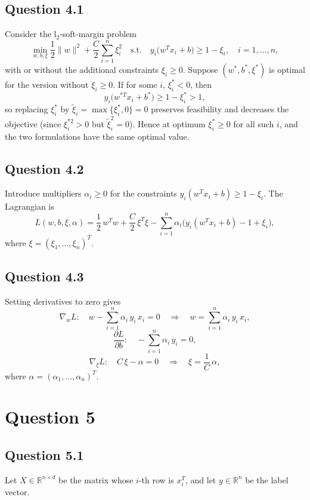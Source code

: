 \documentclass[a4paper]{article}
\begin{document}
\subsection*{Question 4.1}
Consider the l$_2$-soft-margin problem
\[
\min_{w,b,\xi} \frac12\|w\|^2+\frac{C}{2}\sum_{i=1}^n\xi_i^2
\quad\text{s.t.}\quad
y_i\bigl(w^T x_i + b\bigr)\ge 1-\xi_i,\quad i=1,\dots,n,
\]
with or without the additional constraints \(\xi_i\ge0\).  Suppose \((w^*,b^*,\xi^*)\) is optimal for the version without \(\xi_i\ge0\).  If for some \(i\), \(\xi^*_i<0\), then
\[
y_i\bigl(w^{*T}x_i + b^*\bigr) \ge 1-\xi^*_i > 1,
\]
so replacing \(\xi^*_i\) by \(\tilde\xi_i=\max\{\xi^*_i,0\}=0\) preserves feasibility and decreases the objective (since \(\xi^{*2}_i>0\) but \(\tilde\xi_i^2=0\)).  Hence at optimum \(\xi^*_i\ge0\) for all such \(i\), and the two formulations have the same optimal value.


\vspace{2ex}
\subsection*{Question 4.2}
Introduce multipliers \(\alpha_i\ge0\) for the constraints \(y_i(w^T x_i+b)\ge1-\xi_i\).  The Lagrangian is
\[
L(w,b,\xi,\alpha)
=\frac12\,w^T w+\frac{C}{2}\,\xi^T\xi
-\sum_{i=1}^n\alpha_i\bigl(y_i(w^T x_i+b)-1+\xi_i\bigr),
\]
where \(\xi=(\xi_1,\dots,\xi_n)^T\).


\vspace{2ex}
\subsection*{Question 4.3}
Setting derivatives to zero gives
\[
\nabla_w L:\quad
w-\sum_{i=1}^n\alpha_i\,y_i\,x_i=0
\quad\Longrightarrow\quad
w=\sum_{i=1}^n\alpha_i\,y_i\,x_i,
\]
\[
\frac{\partial L}{\partial b}:\quad
-\sum_{i=1}^n\alpha_i\,y_i=0,
\]
\[
\nabla_{\xi}L:\quad
C\,\xi-\alpha=0
\quad\Longrightarrow\quad
\xi=\frac{1}{C}\,\alpha,
\]
where \(\alpha=(\alpha_1,\dots,\alpha_n)^T\).


\newpage
\section*{Question 5}
\subsection*{Question 5.1}
Let \(X \in \mathbb{R}^{n\times d}\) be the matrix whose \(i\)-th row is \(x_i^T\), and let \(y \in \mathbb{R}^{n}\) be the label vector.\\
\end{document}
